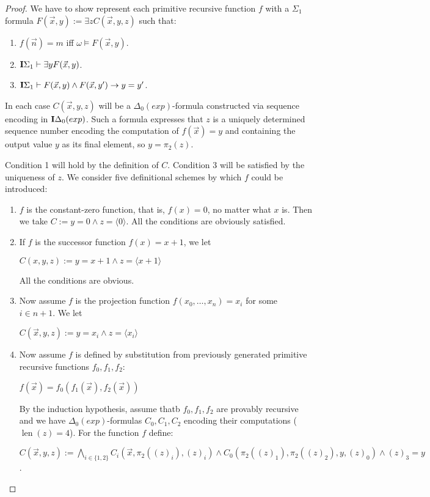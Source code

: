 \documentclass[8pt]{article}
\theoremstyle{definition}
\theoremstyle{definition}
\theoremstyle{definition}
\theoremstyle{definition}
\theoremstyle{definition}
\theoremstyle{definition}
\theoremstyle{definition}
\theoremstyle{definition}
\theoremstyle{definition}
\theoremstyle{definition}
\theoremstyle{definition}
\theoremstyle{definition}
\theoremstyle{definition}
\theoremstyle{question}
\begin{document}
\begin{proof}
  We have to show represent each primitive recursive function $f$ with a $\Sigma_1$ formula 
  $F(\vec{x}, y) := \exists z C(\vec{x}, y, z)$ such that:
  \begin{enumerate}
    \item $f(\vec{n}) = m$ iff $\omega \models F(\vec{x}, y)$.
    \item ${\bf I}\Sigma_1 \vdash \exists y F(\vec{x}, y)$.
    \item ${\bf I}\Sigma_1 \vdash F(\vec{x}, y) \land F(\vec{x}, y') \to y = y'$.
  \end{enumerate}

  In each case $C(\vec{x}, y, z)$ will be a $\Delta_0(exp)$-formula
  constructed via sequence encoding in ${\bf I}\Delta_0(exp)$.
  Such a formula expresses that $z$ is a uniquely determined sequence number encoding the computation of
  $f(\vec{x}) = y$ and containing the output value $y$ as its final element, so $y = \pi_2(z)$.

  Condition 1 will hold by the definition of $C$. 
  Condition 3 will be satisfied by the uniqueness of $z$. We consider five definitional schemes by which $f$ could be
  introduced:
  \begin{enumerate}
    \item $f$ is the constant-zero function, that is, $f(x) = 0$, no matter what $x$ is.
    Then we take $C := y = 0 \land z = \langle 0 \rangle$. All the conditions are obviously satisfied.
    \item If $f$ is the successor function $f(x) = x + 1$, we let
    \begin{center}
      $C(x,y,z) := y = x + 1 \land z = \langle x + 1 \rangle$
    \end{center}
    All the conditions are obvious.
    \item Now assume $f$ is the projection function $f(x_0, \dots, x_n) = x_i$ for some $i \in n + 1$.
    We let
    \begin{center}
      $C(\vec{x},y,z) := y = x_i \land z = \langle x_i \rangle$
    \end{center}
    \item Now assume $f$ is defined by substitution from previously generated primitive recursive functions $f_0, f_1, f_2$:
    \begin{center}
      $f(\vec{x}) = f_0(f_1(\vec{x}), f_2(\vec{x}))$
    \end{center}

    By the induction hypothesis, assume thatb $f_0, f_1, f_2$ are provably recursive and we have 
    $\Delta_0(exp)$-formulas $C_0, C_1, C_2$ encoding their computations ($\operatorname{len}(z) = 4$).
    For the function $f$ define:
    \begin{center}
      $C(\vec{x}, y, z) := \bigwedge \limits_{i \in \{ 1, 2\}} C_i(\vec{x}, \pi_2((z)_i), (z)_i) \land 
      C_0(\pi_2((z)_1), \pi_2((z)_2), y, (z)_0) \land (z)_3 = y$.
    \end{center}


\end{enumerate}
\end{proof}
\end{document}

